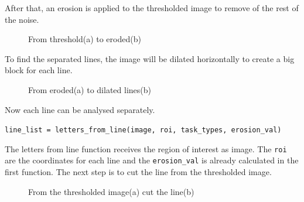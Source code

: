 After that, an erosion is applied to the thresholded image to remove of the rest of the noise.

\begin{figure}[H]
    \centering
    \qquad
    \caption{From threshold(a) to eroded(b)}
\end{figure}

To find the separated lines, the image will be dilated horizontally to create a big block for each line.

\begin{figure}[H]
    \centering
    \qquad
    \caption{From eroded(a) to dilated lines(b)}
\end{figure}

Now each line can be analysed separately.

\texttt{line\_list = letters\_from\_line(image, roi, task\_types, erosion\_val)}

The letters from line function receives the region of interest as image. The \texttt{roi} are the coordinates for each line and the \texttt{erosion\_val} is already calculated in the first function.
The next step is to cut the line from the thresholded image.

\begin{figure}[H]
    \centering
    \qquad
    \caption{From the thresholded image(a) cut the line(b)}
\end{figure}

